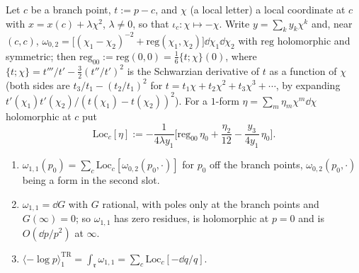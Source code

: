 Let $c$ be a branch point, $t:=p-c$, and $\chi$ (a local letter) a local coordinate at $c$ with $x=x(c)+\lambda\chi^2$, $\lambda\neq 0$, so that $\iota_c\colon\chi\mapsto-\chi$. Write $y=\sum_ky_k\chi^k$ and, near $(c,c)$, $\omega_{0,2}=\big[(\chi_1-\chi_2)^{-2}+\mathrm{reg}(\chi_1,\chi_2)\big]\dd\chi_1\dd\chi_2$ with $\mathrm{reg}$ holomorphic and symmetric; then $\mathrm{reg}_{00}:=\mathrm{reg}(0,0)=\frac16\{t;\chi\}(0)$, where $\{t;\chi\}=t'''/t'-\frac32(t''/t')^2$ is the Schwarzian derivative of $t$ as a function of $\chi$ (both sides are $t_3/t_1-(t_2/t_1)^2$ for $t=t_1\chi+t_2\chi^2+t_3\chi^3+\cdots$, by expanding $t'(\chi_1)t'(\chi_2)/(t(\chi_1)-t(\chi_2))^2$). For a $1$-form $\eta=\sum_m\eta_m\chi^m\dd\chi$ holomorphic at $c$ put
\begin{equation}
\label{eq:mod-loc}
\mathrm{Loc}_c[\eta]:=-\frac{1}{4\lambda y_1}\Big[\mathrm{reg}_{00}\,\eta_0+\frac{\eta_2}{12}-\frac{y_3}{4y_1}\,\eta_0\Big].
\end{equation}

\begin{lem}
\label{lem:mod-w11}
\begin{enumerate}
\item $\omega_{1,1}(p_0)=\sum_c\mathrm{Loc}_c[\omega_{0,2}(p_0,\cdot)]$ for $p_0$ off the branch points, $\omega_{0,2}(p_0,\cdot)$ being a form in the second slot.
\item $\omega_{1,1}=\dd G$ with $G$ rational, with poles only at the branch points and $G(\infty)=0$; so $\omega_{1,1}$ has zero residues, is holomorphic at $p=0$ and is $O(\dd p/p^2)$ at $\infty$.
\item $\langle-\log p\rangle^{\mathrm{TR}}_1=\int_{\mathfrak r}\omega_{1,1}=\sum_c\mathrm{Loc}_c[-\dd q/q]$.
\end{enumerate}
\end{lem}

